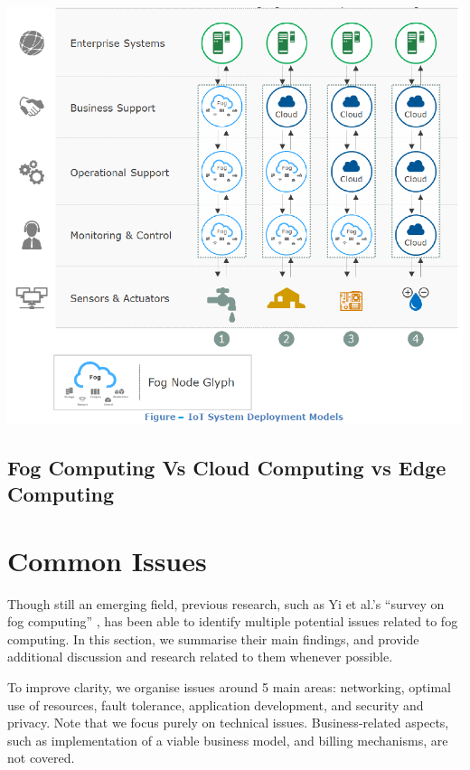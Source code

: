 \documentclass{article}
\begin{document}
\includegraphics[scale=0.7]{models.png}  


\subsection{Fog Computing Vs Cloud Computing vs Edge Computing}

\section{Common Issues}

Though still an emerging field, previous research, such as Yi et al.'s ``survey on fog computing'' \cite{yi2015survey}, has been able to identify multiple potential issues related to fog computing. In this section, we summarise their main findings, and provide additional discussion and research related to them whenever possible.

To improve clarity, we organise issues around 5 main areas: networking, optimal use of resources, fault tolerance, application development, and security and privacy. Note that we focus purely on technical issues. Business-related aspects, such as implementation of a viable business model, and billing mechanisms, are not covered.
\end{document}
